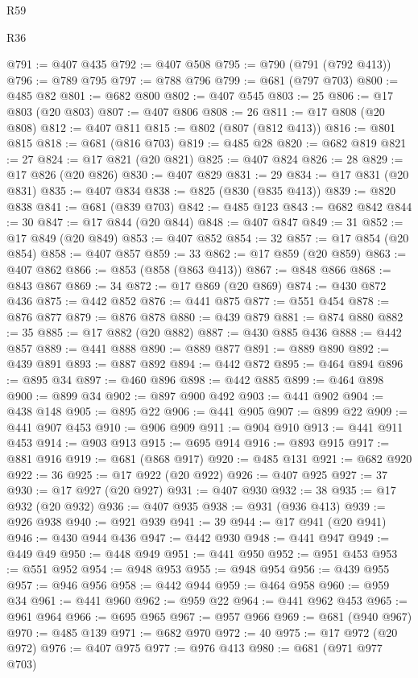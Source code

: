 \begin{lexlean}{R59}
\begin{lexlean}{R36}
\begin{coremodule}
{{{{{{{{{{{{{{{{{{{{{{{{{{{{{{{{{{{{{{{{{{{{{{{{{{{{{{{{{{{{{{{{{{{{{{{{{{{{{{{{{{@791 := @407 @435
@792 := @407 @508
@795 := @790 (@791 (@792 @413))
@796 := @789 @795
@797 := @788 @796
@799 := @681 (@797 @703)
@800 := @485 @82
@801 := @682 @800
@802 := @407 @545
@803 := 25
@806 := @17 @803 (@20 @803)
@807 := @407 @806
@808 := 26
@811 := @17 @808 (@20 @808)
@812 := @407 @811
@815 := @802 (@807 (@812 @413))
@816 := @801 @815
@818 := @681 (@816 @703)
@819 := @485 @28
@820 := @682 @819
@821 := 27
@824 := @17 @821 (@20 @821)
@825 := @407 @824
@826 := 28
@829 := @17 @826 (@20 @826)
@830 := @407 @829
@831 := 29
@834 := @17 @831 (@20 @831)
@835 := @407 @834
@838 := @825 (@830 (@835 @413))
@839 := @820 @838
@841 := @681 (@839 @703)
@842 := @485 @123
@843 := @682 @842
@844 := 30
@847 := @17 @844 (@20 @844)
@848 := @407 @847
@849 := 31
@852 := @17 @849 (@20 @849)
@853 := @407 @852
@854 := 32
@857 := @17 @854 (@20 @854)
@858 := @407 @857
@859 := 33
@862 := @17 @859 (@20 @859)
@863 := @407 @862
@866 := @853 (@858 (@863 @413))
@867 := @848 @866
@868 := @843 @867
@869 := 34
@872 := @17 @869 (@20 @869)
@874 := @430 @872 @436
@875 := @442 @852
@876 := @441 @875
@877 := @551 @454
@878 := @876 @877
@879 := @876 @878
@880 := @439 @879
@881 := @874 @880
@882 := 35
@885 := @17 @882 (@20 @882)
@887 := @430 @885 @436
@888 := @442 @857
@889 := @441 @888
@890 := @889 @877
@891 := @889 @890
@892 := @439 @891
@893 := @887 @892
@894 := @442 @872
@895 := @464 @894
@896 := @895 @34
@897 := @460 @896
@898 := @442 @885
@899 := @464 @898
@900 := @899 @34
@902 := @897 @900 @492
@903 := @441 @902
@904 := @438 @148
@905 := @895 @22
@906 := @441 @905
@907 := @899 @22
@909 := @441 @907 @453
@910 := @906 @909
@911 := @904 @910
@913 := @441 @911 @453
@914 := @903 @913
@915 := @695 @914
@916 := @893 @915
@917 := @881 @916
@919 := @681 (@868 @917)
@920 := @485 @131
@921 := @682 @920
@922 := 36
@925 := @17 @922 (@20 @922)
@926 := @407 @925
@927 := 37
@930 := @17 @927 (@20 @927)
@931 := @407 @930
@932 := 38
@935 := @17 @932 (@20 @932)
@936 := @407 @935
@938 := @931 (@936 @413)
@939 := @926 @938
@940 := @921 @939
@941 := 39
@944 := @17 @941 (@20 @941)
@946 := @430 @944 @436
@947 := @442 @930
@948 := @441 @947
@949 := @449 @49
@950 := @448 @949
@951 := @441 @950
@952 := @951 @453
@953 := @551 @952
@954 := @948 @953
@955 := @948 @954
@956 := @439 @955
@957 := @946 @956
@958 := @442 @944
@959 := @464 @958
@960 := @959 @34
@961 := @441 @960
@962 := @959 @22
@964 := @441 @962 @453
@965 := @961 @964
@966 := @695 @965
@967 := @957 @966
@969 := @681 (@940 @967)
@970 := @485 @139
@971 := @682 @970
@972 := 40
@975 := @17 @972 (@20 @972)
@976 := @407 @975
@977 := @976 @413
@980 := @681 (@971 @977 @703)
}}}}}}}}}}}}}}}}}}}}}}}}}}}}}}}}}}}}}}}}}}}}}}}}}}}}}}}}}}}}}}}}}}}}}}}}}}}}}}}}}}
\end{coremodule}
\end{lexlean}
\end{lexlean}
